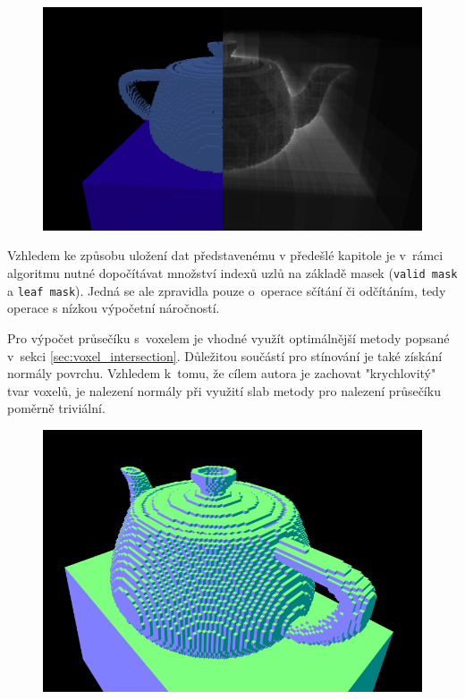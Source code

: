 \begin{figure}[H]
	\centering
	\includegraphics[scale=1]{obrazky-figures/color_iter_svo.png}
	\captionsetup{justification=centering}
	\label{fig:octree_child}
\end{figure}

Vzhledem ke způsobu uložení dat představenému v předešlé kapitole je v~rámci algoritmu nutné dopočítávat množství indexů uzlů na základě masek (\texttt{valid mask} a \texttt{leaf mask}). Jedná se ale zpravidla pouze o~operace sčítání či odčítáním, tedy operace s nízkou výpočetní náročností.

Pro výpočet průsečíku s~voxelem je vhodné využít optimálnější metody popsané v~sekci \ref{sec:voxel_intersection}. Důležitou součástí pro stínování je také získání normály povrchu. Vzhledem k~tomu, že cílem autora je zachovat "krychlovitý" tvar voxelů, je nalezení normály při využití slab metody pro nalezení průsečíku poměrně triviální.

\begin{figure}[H]
	\centering
	\includegraphics[scale=1]{obrazky-figures/normals_teapot.png}
	\captionsetup{justification=centering}
	\label{fig:octree_child}
\end{figure}

